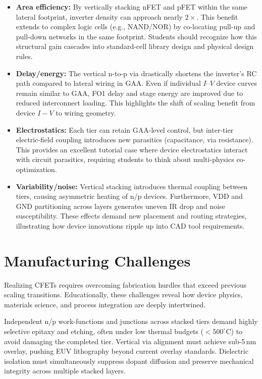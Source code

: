 \documentclass[conference]{IEEEtran}
\begin{document}
\begin{itemize}
  \item \textbf{Area efficiency:} By vertically stacking nFET and pFET
  within the same lateral footprint, inverter density can approach
  nearly $2\times$. This benefit extends to complex logic cells
  (e.g., NAND/NOR) by co-locating pull-up and pull-down networks in
  the same footprint. Students should recognize how this structural
  gain cascades into standard-cell library design and physical design
  rules.

  \item \textbf{Delay/energy:} The vertical n-to-p via drastically
  shortens the inverter's RC path compared to lateral wiring in GAA.
  Even if individual $I$–$V$ device curves remain similar to GAA,
  FO1 delay and stage energy are improved due to reduced
  interconnect loading. This highlights the shift of scaling benefit
  from device $I\!-\!V$ to wiring geometry.

  \item \textbf{Electrostatics:} Each tier can retain GAA-level control,
  but inter-tier electric-field coupling introduces new parasitics
  (capacitance, via resistance). This provides an excellent tutorial
  case where device electrostatics interact with circuit parasitics,
  requiring students to think about multi-physics co-optimization.

  \item \textbf{Variability/noise:} Vertical stacking introduces thermal
  coupling between tiers, causing asymmetric heating of n/p devices.
  Furthermore, VDD and GND partitioning across layers generates
  uneven IR drop and noise susceptibility. These effects demand new
  placement and routing strategies, illustrating how device
  innovations ripple up into CAD tool requirements.
\end{itemize}

\section{Manufacturing Challenges}
Realizing CFETs requires overcoming fabrication hurdles that exceed
previous scaling transitions. Educationally, these challenges reveal
how device physics, materials science, and process integration are
deeply intertwined.

Independent n/p work-functions and junctions across stacked tiers
demand highly selective epitaxy and etching, often under low thermal
budgets ($<500^{\circ}$C) to avoid damaging the completed tier.
Vertical via alignment must achieve sub-5\,nm overlay, pushing EUV
lithography beyond current overlay standards. Dielectric isolation
must simultaneously suppress dopant diffusion and preserve mechanical
integrity across multiple stacked layers.
\end{document}
